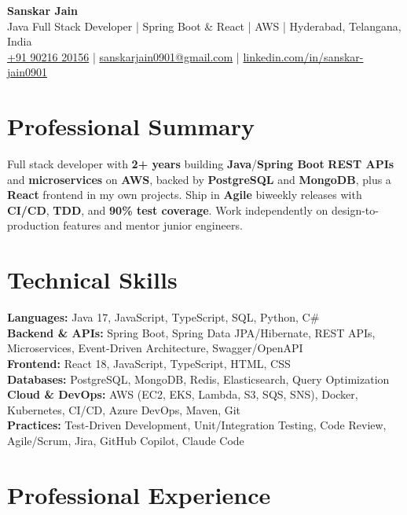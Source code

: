 \documentclass[a4paper,10pt]{article}
\begin{document}
\begin{center}
    {\LARGE \textbf{Sanskar Jain}} \\
    \vspace{2pt}
    Java Full Stack Developer \;|\; Spring Boot \& React \;|\; AWS \;|\; Hyderabad, Telangana, India \\
    \vspace{2pt}
    \href{tel:+919021620156}{+91 90216 20156} \;|\;
    \href{mailto:sanskarjain0901@gmail.com}{sanskarjain0901@gmail.com} \;|\;
    \href{https://www.linkedin.com/in/sanskar-jain0901/}{linkedin.com/in/sanskar-jain0901}
\end{center}

\section*{Professional Summary}
Full stack developer with \textbf{2+ years} building \textbf{Java}/\textbf{Spring Boot} \textbf{REST APIs} and \textbf{microservices} on \textbf{AWS}, backed by \textbf{PostgreSQL} and \textbf{MongoDB}, plus a \textbf{React} frontend in my own projects. Ship in \textbf{Agile} biweekly releases with \textbf{CI/CD}, \textbf{TDD}, and \textbf{90\% test coverage}. Work independently on design-to-production features and mentor junior engineers.

\section*{Technical Skills}
\begin{sloppypar}
\noindent
\textbf{Languages:} Java 17, JavaScript, TypeScript, SQL, Python, C\# \\
\textbf{Backend \& APIs:} Spring Boot, Spring Data JPA/Hibernate, REST APIs, Microservices, Event-Driven Architecture, Swagger/OpenAPI \\
\textbf{Frontend:} React 18, JavaScript, TypeScript, HTML, CSS \\
\textbf{Databases:} PostgreSQL, MongoDB, Redis, Elasticsearch, Query Optimization \\
\textbf{Cloud \& DevOps:} AWS (EC2, EKS, Lambda, S3, SQS, SNS), Docker, Kubernetes, CI/CD, Azure DevOps, Maven, Git \\
\textbf{Practices:} Test-Driven Development, Unit/Integration Testing, Code Review, Agile/Scrum, Jira, GitHub Copilot, Claude Code
\end{sloppypar}

\section*{Professional Experience}
\end{document}
